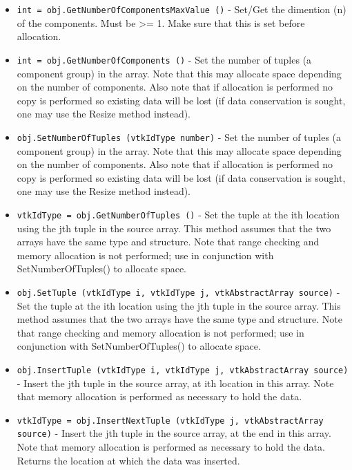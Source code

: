 \begin{itemize}
\item  \verb|int = obj.GetNumberOfComponentsMaxValue ()| -  Set/Get the dimention (n) of the components. Must be >= 1. Make sure that
 this is set before allocation.

\item  \verb|int = obj.GetNumberOfComponents ()| -  Set the number of tuples (a component group) in the array. Note that 
 this may allocate space depending on the number of components.
 Also note that if allocation is performed no copy is performed so
 existing data will be lost (if data conservation is sought, one may
 use the Resize method instead).

\item  \verb|obj.SetNumberOfTuples (vtkIdType number)| -  Set the number of tuples (a component group) in the array. Note that 
 this may allocate space depending on the number of components.
 Also note that if allocation is performed no copy is performed so
 existing data will be lost (if data conservation is sought, one may
 use the Resize method instead).

\item  \verb|vtkIdType = obj.GetNumberOfTuples ()| -  Set the tuple at the ith location using the jth tuple in the source array.
 This method assumes that the two arrays have the same type
 and structure. Note that range checking and memory allocation is not 
 performed; use in conjunction with SetNumberOfTuples() to allocate space.

\item  \verb|obj.SetTuple (vtkIdType i, vtkIdType j, vtkAbstractArray source)| -  Set the tuple at the ith location using the jth tuple in the source array.
 This method assumes that the two arrays have the same type
 and structure. Note that range checking and memory allocation is not 
 performed; use in conjunction with SetNumberOfTuples() to allocate space.

\item  \verb|obj.InsertTuple (vtkIdType i, vtkIdType j, vtkAbstractArray source)| -  Insert the jth tuple in the source array, at ith location in this array. 
 Note that memory allocation is performed as necessary to hold the data.

\item  \verb|vtkIdType = obj.InsertNextTuple (vtkIdType j, vtkAbstractArray source)| -  Insert the jth tuple in the source array, at the end in this array. 
 Note that memory allocation is performed as necessary to hold the data.
 Returns the location at which the data was inserted.


\end{itemize}
